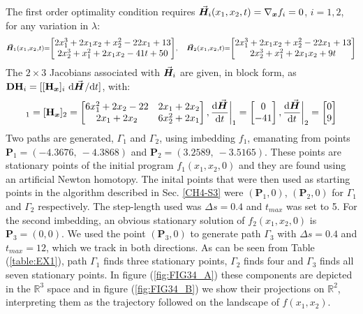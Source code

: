 The first order optimality condition requires 
$\vec{\bm{H}}_i(x_1,x_2,t)=\nabla_{\bm{x}}f_i=0$, $i=1,2$,
for any variation in $\lambda$:
\begin{equation}
	\scriptstyle{
	\vec{\bm{H}}_1(x_1,x_2,t) = \begin{bmatrix}
		2x_1^3+2x_1x_2+x_2^2-22x_1+13\\
		2x_2^3+x_1^2+2x_1x_2-41t+50
	\end{bmatrix},\quad \vec{\bm{H}}_2(x_1,x_2,t) = \begin{bmatrix}
		2x_1^3+2x_1x_2+x_2^2-22x_1+13\\
		2x_2^3+x_1^2+2x_1x_2+9t
	\end{bmatrix}
}
	\label{eq:Sgrads}
\end{equation}
The $2\times 3$ Jacobians  associated with $\vec{\bm{H}}_i$ are given, in block 
form,
as $\bmat{DH}_i=[[\bmat{H}_{\bm{x}}]_i\ \text{d}\bvec{H}^{}/\text{d}t]$, with:
\begin{equation}
	[\bmat{H}_{\bm{x}}]_1= [\bmat{H}_{\bm{x}}]_2 = \begin{bmatrix}
		6x_1^2+2x_2-22 & 2x_1+2x_2\\
		2x_1+2x_2 & 6x_2^2+2x_1
	\end{bmatrix}
	, \frac{\text{d}\bvec{H}}{\text{d}t}\bigg|_1=\begin{bmatrix}
		0\\
		-41
	\end{bmatrix},
\frac{\text{d}\bvec{H}}{\text{d}t}\bigg|_2=\begin{bmatrix}
		0\\
		9
	\end{bmatrix}
	\label{eq:JBS}
\end{equation}
Two paths are generated, $\mathit{\Gamma}_1$ and $\mathit{\Gamma}_2$, using
imbedding $f_1$,
emanating from points $\mathbf{P}_1=(-4.3676,\ -4.3868)$ and
$\mathbf{P}_2=(3.2589,\ -3.5165)$. These points are stationary points of the
initial program $f_1(x_1,x_2,0)$ and they are found using an artificial Newton
homotopy. The inital points that were then used as starting points in the 
algorithm
described in Sec. \ref{CH4-S3} were $(\mathbf{P}_1,0)$, $(\mathbf{P}_2,0)$ for
$\mathit{\Gamma}_1$ and $\mathit{\Gamma}_2$ respectively. The step-length used
was $\Delta s=0.4$ and $t_{max}$ was set to 5. For the second imbedding, an 
obvious stationary solution of
$f_2(x_1,x_2,0)$ is $\mathbf{P}_3=(0,0)$. We used the point $(\mathbf{P}_3,0)$ 
to generate path
$\mathit{\Gamma}_3$ with $\Delta s=0.4$ and $t_{max}=12$, which we track in 
both directions. As can be seen from
Table (\ref{table:EX1}), path $\mathit{\Gamma}_1$ finds three stationary
points, $\mathit{\Gamma}_2$ finds four and $\mathit{\Gamma}_3$ finds all seven
stationary points. In figure (\ref{fig:FIG34_A}) these components are 
depicted in the $\mathbb{R}^3$ space and in figure (\ref{fig:FIG34_B}) 
we show their projections on $\mathbb{R}^2$, interpreting them as the 
trajectory followed on the landscape of $f(x_1,x_2)$.

